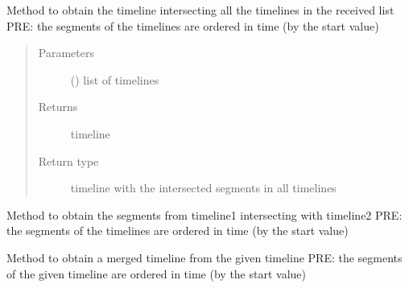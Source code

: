 \begin{fulllineitems}
\label{\detokenize{eboa.ingestion:eboa.ingestion.functions.intersect_many_timelines}}
Method to obtain the timeline intersecting all the timelines in the received list
PRE: the segments of the timelines are ordered in time (by the start value)
\begin{quote}\begin{description}
\item[{Parameters}] \leavevmode
{} () \textendash{} list of timelines

\item[{Returns}] \leavevmode
timeline

\item[{Return type}] \leavevmode
timeline with the intersected segments in all timelines

\end{description}\end{quote}

\end{fulllineitems}


\begin{fulllineitems}
\label{\detokenize{eboa.ingestion:eboa.ingestion.functions.intersect_timelines}}
Method to obtain the segments from timeline1 intersecting with timeline2
PRE: the segments of the timelines are ordered in time (by the start value)

\end{fulllineitems}


\begin{fulllineitems}
\label{\detokenize{eboa.ingestion:eboa.ingestion.functions.merge_timeline}}
Method to obtain a merged timeline from the given timeline
PRE: the segments of the given timeline are ordered in time (by the start value)

\end{fulllineitems}

